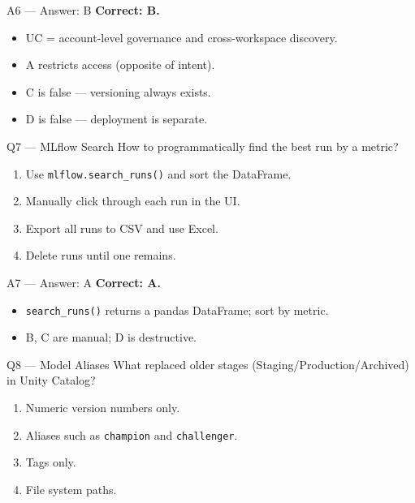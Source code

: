 \documentclass[aspectratio=169,10pt]{beamer}
\begin{document}
	\begin{frame}{A6 — Answer: B}
		\textbf{Correct: B.}
		\begin{itemize}
			\item UC = account-level governance and cross-workspace discovery.
			\item A restricts access (opposite of intent).
			\item C is false — versioning always exists.
			\item D is false — deployment is separate.
		\end{itemize}
	\end{frame}
	
	\begin{frame}{Q7 — MLflow Search}
		How to programmatically find the best run by a metric?
		\begin{enumerate}[label=\Alph*.]
			\item Use \texttt{mlflow.search\_runs()} and sort the DataFrame.
			\item Manually click through each run in the UI.
			\item Export all runs to CSV and use Excel.
			\item Delete runs until one remains.
		\end{enumerate}
	\end{frame}
	
	\begin{frame}{A7 — Answer: A}
		\textbf{Correct: A.}
		\begin{itemize}
			\item \texttt{search\_runs()} returns a pandas DataFrame; sort by metric.
			\item B, C are manual; D is destructive.
		\end{itemize}
	\end{frame}
	
	\begin{frame}{Q8 — Model Aliases}
		What replaced older stages (Staging/Production/Archived) in Unity Catalog?
		\begin{enumerate}[label=\Alph*.]
			\item Numeric version numbers only.
			\item Aliases such as \texttt{champion} and \texttt{challenger}.
			\item Tags only.
			\item File system paths.
		\end{enumerate}
	\end{frame}
	
\end{document}
